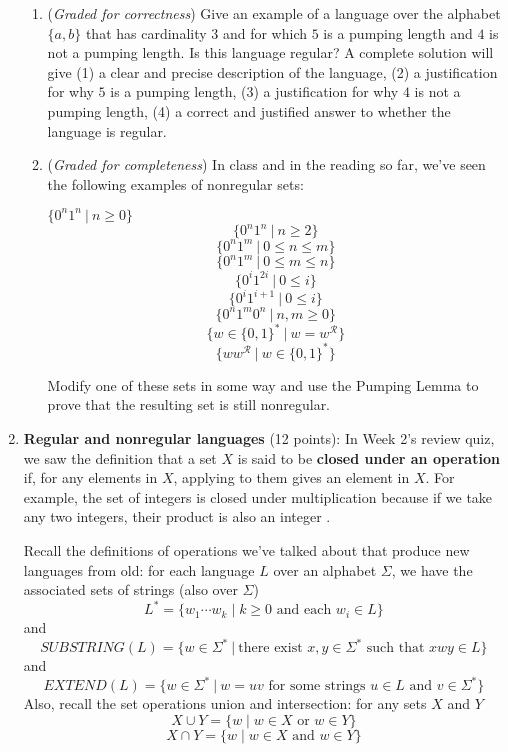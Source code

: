 \documentclass[12pt, oneside]{article}
\newcommand{\gradeCorrect}{({\it Graded for correctness}) }
\newcommand{\gradeComplete}{({\it Graded for completeness}) }
\begin{document}
\begin{enumerate}[wide, labelwidth=!, labelindent=0pt]
\begin{enumerate}
\item\gradeCorrect Give an example of a language
over the alphabet $\{a,b\}$ that has cardinality $3$ and for which $5$ is a pumping length
and $4$ is not a pumping length. Is this language regular? A complete solution will give 
(1) a clear and precise
description of the language, (2) a justification for why $5$ is a pumping length, (3) a 
justification for why $4$ is not a pumping length, (4) a correct and justified answer to 
whether the language is regular.


\item\gradeComplete In class and in the reading so far, we've seen the following examples of nonregular sets:
\begin{multicols}{3}
\begin{center}
$\{ 0^n 1^n ~|~ n \geq 0 \}$
$$\{ 0^n 1^n ~|~ n \geq 2 \}$$
$$\{ 0^n 1^m ~|~  0 \leq n \leq m \}$$
$$\{ 0^n 1^m ~|~ 0 \leq m \leq n \}$$
$$\{ 0^i 1^{2i} ~|~ 0 \leq i \}$$
$$\{ 0^i 1^{i+1} ~|~ 0 \leq i \}$$
$$\{ 0^n 1^m 0^n ~|~n,m \geq 0\}$$
$$\{ w \in \{0,1\}^* ~|~w = w^{\mathcal{R}}\}$$
$$\{ w w^{\mathcal{R}} ~|~ w \in \{0,1\}^*\}$$
\end{center}
\end{multicols}
Modify one of these sets in some way and use the Pumping Lemma to prove that the resulting set is still nonregular.

\end{enumerate}

\item\textbf{Regular and nonregular languages} (12 points):
In Week 2's review quiz, we saw the definition that a set $X$ is said to be 
{\bf closed under an operation} if, for any elements in
$X$, applying to them gives an element in $X$. For example, the set of
integers is closed under multiplication because if we take any two
integers, their product is also an integer .

Recall the definitions of operations we've talked about that produce
new languages from old: for each language $L$ over an alphabet $\Sigma$, 
we have the 
associated sets of strings (also over $\Sigma$)
\[
    L^* = \{ w_1 \cdots w_k \mid k \geq 0 \textrm{ and each } w_i \in L\}
\]
and
\[
    SUBSTRING(L) = \{ w \in \Sigma^* ~|~ \text{there exist } x,y \in \Sigma^* \text{ such that } xwy \in L\}
\]
and 
\[
    EXTEND(L) = \{ w \in \Sigma^* ~|~ w = uv \text{ for some strings } u \in L \text{ and } v \in \Sigma^* \}
\]
Also, recall the set operations union and intersection: for any sets $X$ and $Y$
\[
X \cup Y = \{ w \mid w \in X \text{ or } w \in Y \}
\]
\[
X \cap Y = \{ w \mid w \in X \text{ and } w \in Y \}
\]


\end{enumerate}
\end{document}
